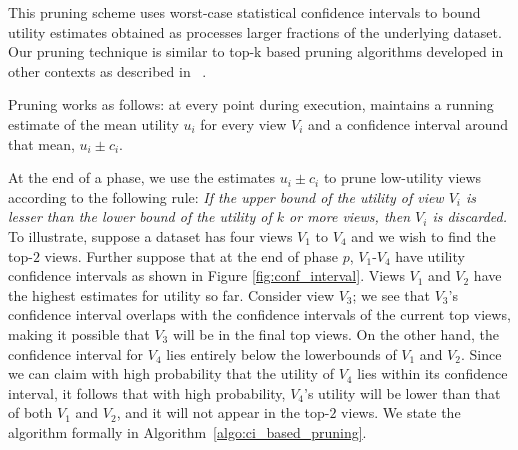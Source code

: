 \label{sec:confidence_interval}
This pruning scheme uses worst-case statistical confidence intervals to bound utility estimates obtained as \SeeDB
processes larger fractions of the underlying dataset.
Our pruning technique is similar to top-k based pruning 
algorithms developed 
in other contexts as described in ~\cite{DBLP:conf/pods/FaginLN01, 
DBLP:conf/vldb/IlyasAE04, DBLP:conf/ICDE/ReDS07}.

Pruning works as follows: at every point during execution, \SeeDB
maintains a running estimate of the mean utility $u_i$ for every view 
$V_i$ and a confidence interval around that mean, $u_i \pm c_i$.	

At the end of a phase, we use the estimates $u_i \pm c_i$ to prune low-utility views according to the following rule:
{\em If the upper bound of the utility of view $V_i$ is lesser
than the lower bound of the utility of $k$ or more views, then $V_i$ is discarded.}
To illustrate, suppose a dataset has four views $V_1$ to $V_4$ and we wish to find the top-$2$ views.
Further suppose that at the end of phase $p$,
$V_1$-$V_4$ have utility confidence intervals as shown in Figure \ref{fig:conf_interval}.
Views $V_1$ and $V_2$ have the highest estimates for utility so far.
Consider view $V_3$; we see that $V_3$'s confidence interval overlaps with the
confidence intervals of the current top views, making it possible
that $V_3$ will be in the final top views. On the other hand, the confidence
interval for $V_4$ lies entirely below the lowerbounds of $V_1$ and $V_2$.
Since we can claim with high probability
that the utility of $V_4$ lies within its confidence interval, it follows that
with high probability, $V_4$'s utility will be lower than that of both $V_1$ and
$V_2$, and it will not appear in the top-$2$ views.
We state the algorithm formally in
Algorithm~\ref{algo:ci_based_pruning}.

